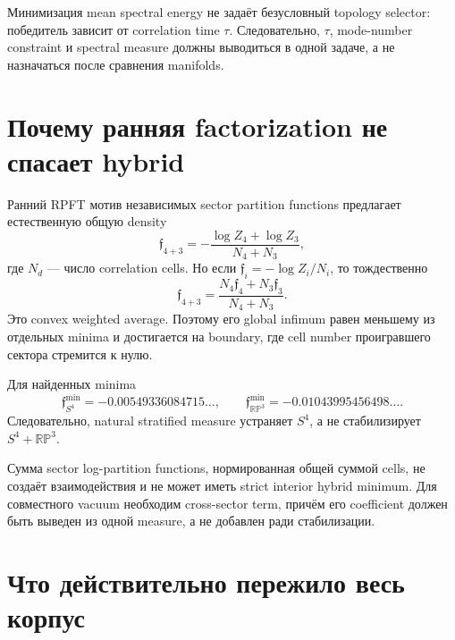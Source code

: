 \begin{theorem}
Минимизация mean spectral energy не задаёт безусловный topology selector:
победитель зависит от correlation time \(\tau\). Следовательно,
\(\tau\), mode-number constraint и spectral measure должны выводиться в
одной задаче, а не назначаться после сравнения manifolds.
\end{theorem}

\section{Почему ранняя factorization не спасает hybrid}

Ранний RPFT мотив независимых sector partition functions предлагает
естественную общую density
\begin{equation}
 \mathfrak f_{4+3}
 =-\frac{\log Z_4+\log Z_3}{N_4+N_3},
\end{equation}
где \(N_d\) --- число correlation cells. Но если
\(\mathfrak f_i=-\log Z_i/N_i\), то тождественно
\begin{equation}
 \mathfrak f_{4+3}
 =\frac{N_4\mathfrak f_4+N_3\mathfrak f_3}{N_4+N_3}.
 \label{eq:stratified-weighted-average}
\end{equation}
Это convex weighted average. Поэтому его global infimum равен меньшему из
отдельных minima и достигается на boundary, где cell number проигравшего
сектора стремится к нулю.

Для найденных minima
\begin{equation}
 \mathfrak f_{S^4}^{\min}=-0.00549336084715\ldots,
 \qquad
 \mathfrak f_{\mathbb{RP}^3}^{\min}=-0.01043995456498\ldots.
\end{equation}
Следовательно, natural stratified measure устраняет \(S^4\), а не
стабилизирует \(S^4+\mathbb{RP}^3\).

\begin{nogocriterion}
Сумма sector log-partition functions, нормированная общей суммой cells, не
создаёт взаимодействия и не может иметь strict interior hybrid minimum.
Для совместного vacuum необходим cross-sector term, причём его coefficient
должен быть выведен из одной measure, а не добавлен ради стабилизации.
\end{nogocriterion}

\section{Что действительно пережило весь корпус}

